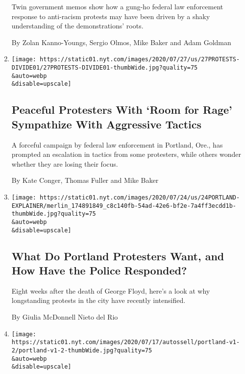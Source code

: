 \begin{enumerate}
  Twin government memos show how a gung-ho federal law enforcement
  response to anti-racism protests may have been driven by a shaky
  understanding of the demonstrations' roots.

  By Zolan Kanno-Youngs, Sergio Olmos, Mike Baker and Adam Goldman
\item
  \href{/2020/07/27/us/protests-divisions-blm.html}{}

  \texttt{[image: https://static01.nyt.com/images/2020/07/27/us/27PROTESTS-DIVIDE01/27PROTESTS-DIVIDE01-thumbWide.jpg?quality=75\\\&auto=webp\\\&disable=upscale]}

  \hypertarget{peaceful-protesters-with-room-for-rage-sympathize-with-aggressive-tactics}{%
  \subsection{Peaceful Protesters With `Room for Rage' Sympathize With
  Aggressive
  Tactics}\label{peaceful-protesters-with-room-for-rage-sympathize-with-aggressive-tactics}}

  A forceful campaign by federal law enforcement in Portland, Ore., has
  prompted an escalation in tactics from some protesters, while others
  wonder whether they are losing their focus.

  By Kate Conger, Thomas Fuller and Mike Baker
\item
  \href{/article/portland-protests-explained-protesters.html}{}

  \texttt{[image: https://static01.nyt.com/images/2020/07/24/us/24PORTLAND-EXPLAINER/merlin\_174891849\_c8c140fb-54ad-42e6-bf2e-7a4ff3ecdd1b-thumbWide.jpg?quality=75\\\&auto=webp\\\&disable=upscale]}

  \hypertarget{what-do-portland-protesters-want-and-how-have-the-police-responded}{%
  \subsection{What Do Portland Protesters Want, and How Have the Police
  Responded?}\label{what-do-portland-protesters-want-and-how-have-the-police-responded}}

  Eight weeks after the death of George Floyd, here's a look at why
  longstanding protests in the city have recently intensified.

  By Giulia McDonnell Nieto del Rio
\item
  \href{/2020/07/25/us/portland-federal-legal-jurisdiction-courts.html}{}

  \texttt{[image: https://static01.nyt.com/images/2020/07/17/autossell/portland-v1-2/portland-v1-2-thumbWide.jpg?quality=75\\\&auto=webp\\\&disable=upscale]}


\end{enumerate}

